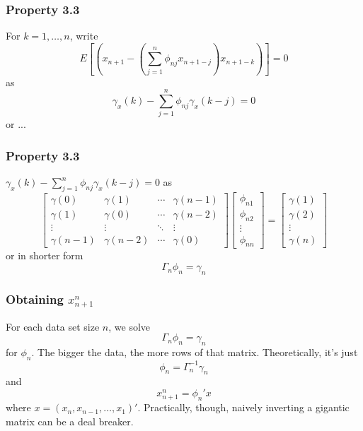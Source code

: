 \documentclass[%
xcolor=pdftex]{beamer}
\begin{document}
\begin{frame}
\frametitle{Property 3.3}

For $k=1,\ldots,n$, write
$$
E\left[ \left(x_{n+1} - \left( \sum_{j=1}^n \phi_{nj} x_{n+1-j}\right)x_{n+1-k} \right) \right] = 0
$$
as
$$
\gamma_x(k) - \sum_{j=1}^n \phi_{nj}\gamma_x(k-j) = 0
$$
or ... 


\end{frame}


\begin{frame}
\frametitle{Property 3.3}
$\gamma_x(k) - \sum_{j=1}^n \phi_{nj}\gamma_x(k-j) = 0$
as
$$
\begin{bmatrix}
\gamma(0) & \gamma(1) & \cdots &\gamma(n-1) \\
\gamma(1) & \gamma(0) & \cdots & \gamma(n-2) \\
\vdots & \vdots & \ddots & \vdots \\
\gamma(n-1) & \gamma(n-2) & \cdots & \gamma(0)
\end{bmatrix}
\begin{bmatrix}
\phi_{n1} \\
\phi_{n2} \\
\vdots\\
\phi_{nn}
\end{bmatrix}
=
\begin{bmatrix}
\gamma(1) \\
\gamma(2) \\
\vdots \\
\gamma(n)
\end{bmatrix}
$$
or in shorter form
$$
\Gamma_n \phi_n = \gamma_n
$$


\end{frame}


\begin{frame}
\frametitle{Obtaining $x_{n+1}^n$ }

For each data set size $n$, we solve 
$$
\Gamma_n \phi_n = \gamma_n
$$
for $\phi_n$. The bigger the data, the more rows of that matrix. Theoretically, it's just
$$
\phi_n = \Gamma_n^{-1} \gamma_n
$$
and 
$$
x_{n+1}^n = \phi_n' x
$$
where $x = (x_n, x_{n-1}, \ldots, x_1)'$. Practically, though, naively inverting a gigantic matrix can be a deal breaker.

\end{frame}
\end{document}
